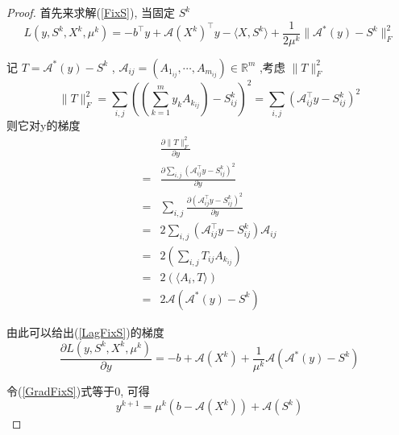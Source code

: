 \documentclass[a4paper, UTF8]{ctexart}				%
\numberwithin{equation}{section}				%
\begin{document}
			\begin{proof}
				首先来求解(\ref{FixS}), 当固定 $S^k$
				\begin{equation}\label{LagFixS}
						L(y, S^k, X^k, \mu^k)
					=	-b^\top y + \mathcal{A}(X^k)^\top y - \langle{X, S^k}\rangle+ \frac{1}{2\mu^k} \lVert{\mathcal{A}^*(y) - S^k}\rVert^2_F
				\end{equation}

				记 $T = \mathcal{A}^*(y) - S^k$ , $\mathcal{A}_{ij} = (A_{1_{ij}}, \cdots, A_{m_{ij}}) \in \mathbb{R}^{m}$ ,考虑 $\lVert{T}\rVert^2_F$
				\[
						\lVert{T}\rVert^2_F
					=	\sum_{i, j}((\sum^m_{k = 1} y_k A_{k_{ij}}) - S^k_{ij})^2
					=	\sum_{i, j}(\mathcal{A}_{ij}^\top y - S^k_{ij})^2
				\]
				则它对y的梯度
				\begin{equation}
					\begin{aligned}
							& \frac{\partial \lVert{T}\rVert^2_F}{\partial y}\\
						=	& \frac{\partial \sum_{i, j}(\mathcal{A}_{ij}^\top y - S^k_{ij})^2}{\partial y}\\
						=	& \sum_{i, j}\frac{\partial (\mathcal{A}_{ij}^\top y - S^k_{ij})^2}{\partial y} \\
						=	& 2\sum_{i, j}(\mathcal{A}_{ij}^\top y - S^k_{ij}) \mathcal{A}_{ij}\\
						=	& 2(\sum_{i, j}T_{ij} A_{k_{ij}})\\
						=	& 2(\langle{A_i, T}\rangle)\\
						=	& 2\mathcal{A}(\mathcal{A}^*(y) - S^k)
					\end{aligned}
				\end{equation}

				\quad 由此可以给出(\ref{LagFixS})的梯度
				\begin{equation}\label{GradFixS}
						\frac{\partial L(y, S^k, X^k, \mu^k)}{\partial y}
					=	-b + \mathcal{A}(X^k) + \frac{1}{\mu^k} \mathcal{A}(\mathcal{A}^*(y) - S^k)
				\end{equation}

				\quad 令(\ref{GradFixS})式等于0, 可得
				\begin{equation}
					y^{k + 1} = \mu^k(b - \mathcal{A}(X^k)) + \mathcal{A}(S^k)
				\end{equation}


\end{proof}
\end{document}
